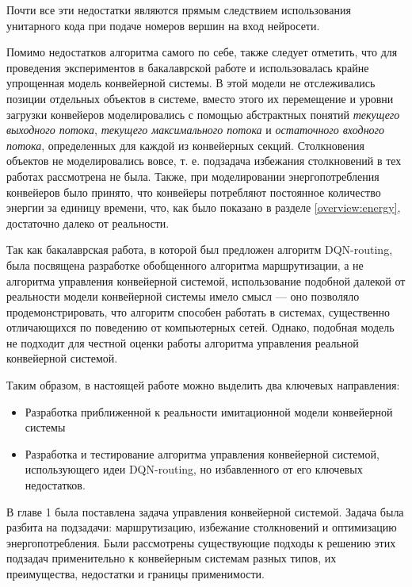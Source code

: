 \documentclass[specification,annotation,times]{itmo-student-thesis}
\theoremstyle{definition}
\begin{document}
Почти все эти недостатки являются прямым следствием использования унитарного
кода при подаче номеров вершин на вход нейросети.

Помимо недостатков алгоритма самого по себе, также следует отметить, что для
проведения экспериментов в бакалаврской работе и \cite{mukhutdinov2019multi}
использовалась крайне упрощенная модель конвейерной системы. В этой модели не
отслеживались позиции отдельных объектов в системе, вместо этого их перемещение
и уровни загрузки конвейеров моделировались с помощью абстрактных понятий
\textit{текущего выходного потока}, \textit{текущего максимального потока} и
\textit{остаточного входного потока}, определенных для каждой из конвейерных
секций. Столкновения объектов не моделировались вовсе, т. е. подзадача избежания
столкновений в тех работах рассмотрена не была. Также, при моделировании
энергопотребления конвейеров было принято, что конвейеры потребляют постоянное
количество энергии за единицу времени, что, как было показано в разделе
\ref{overview:energy}, достаточно далеко от реальности.

Так как бакалаврская работа, в которой был предложен алгоритм DQN-routing, была
посвящена разработке обобщенного алгоритма маршрутизации, а не алгоритма
управления конвейерной системой, использование подобной далекой от реальности
модели конвейерной системы имело смысл --- оно позволяло продемонстрировать, что
алгоритм способен работать в системах, существенно отличающихся по поведению от
компьютерных сетей. Однако, подобная модель не подходит для честной оценки
работы алгоритма управления реальной конвейерной системой.

Таким образом, в настоящей работе можно выделить два ключевых направления:
\begin{itemize}
  \item Разработка приближенной к реальности имитационной модели конвейерной системы
  \item Разработка и тестирование алгоритма управления конвейерной системой,
    использующего идеи DQN-routing, но избавленного от его ключевых недостатков.
\end{itemize}

\chapterconclusion

В главе 1 была поставлена задача управления конвейерной системой. Задача была
разбита на подзадачи: маршрутизацию, избежание столкновений и оптимизацию
энергопотребления. Были рассмотрены существующие подходы к решению этих подзадач
применительно к конвейерным системам разных типов, их преимущества, недостатки и
границы применимости.
\end{document}
